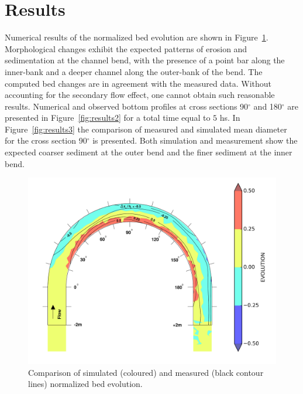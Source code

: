 \section{Results}
%
Numerical results of the normalized bed evolution are shown in
Figure~\ref{fig:results1}. Morphological changes exhibit the expected patterns
of erosion and sedimentation at the channel bend, with the presence of a point
bar along the inner-bank and a deeper channel along the outer-bank of the bend.
The computed bed changes are in agreement with the measured data. Without
accounting for the secondary flow effect, one cannot obtain such reasonable
results.
Numerical and observed bottom profiles at cross sections 90$^{\circ}$ and
180$^{\circ}$ are presented in Figure~\ref{fig:results2} for a total time equal
to $5$ hs.
In Figure~\ref{fig:results3} the comparison of measured and simulated mean
diameter for the cross section 90$^{\circ}$ is presented. Both simulation and
measurement show the expected coarser sediment at the outer bend and the finer
sediment at the inner bend.


\begin{figure} [!h]
\centering
\includegraphics[width=.96\textwidth]{EvolutionR05_cvsm.png}
 \caption{Comparison of simulated (coloured) and measured (black contour lines) normalized bed evolution.}\label{fig:results1}
\end{figure}

